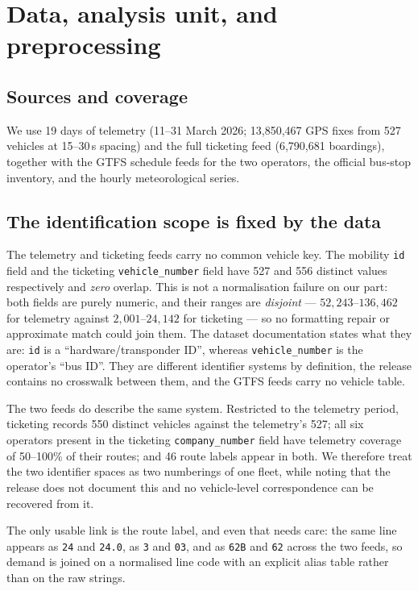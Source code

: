 \documentclass[9pt,twocolumn,twoside]{opticajnl}
\begin{document}
\section{Data, analysis unit, and preprocessing}\label{sec:data}

\subsection{Sources and coverage}

We use 19 days of telemetry (11--31 March 2026; 13{,}850{,}467 GPS fixes from 527 vehicles at
15--30\,s spacing) and the full ticketing feed (6{,}790{,}681 boardings), together with the
GTFS schedule feeds for the two operators, the official bus-stop inventory, and the hourly
meteorological series.

\subsection{The identification scope is fixed by the data}

The telemetry and ticketing feeds carry no common vehicle key. The mobility \texttt{id} field and
the ticketing \texttt{vehicle\_number} field have 527 and 556 distinct values respectively and
\emph{zero} overlap. This is not a normalisation failure on our part: both fields are purely
numeric, and their ranges are \emph{disjoint} --- $52{,}243$--$136{,}462$ for telemetry against
$2{,}001$--$24{,}142$ for ticketing --- so no formatting repair or approximate match could join
them. The dataset documentation states what they are: \texttt{id} is a ``hardware/transponder
ID'', whereas \texttt{vehicle\_number} is the operator's ``bus ID''. They are different
identifier systems by definition, the release contains no crosswalk between them, and the GTFS
feeds carry no vehicle table.

The two feeds do describe the same system. Restricted to the telemetry period, ticketing records
550 distinct vehicles against the telemetry's 527; all six operators present in the ticketing
\texttt{company\_number} field have telemetry coverage of 50--100\% of their routes; and 46
route labels appear in both. We therefore treat the two identifier spaces as two numberings of
one fleet, while noting that the release does not document this and no vehicle-level
correspondence can be recovered from it.

The only usable link is the route label, and even that needs care: the same line appears as
\texttt{24} and \texttt{24.0}, as \texttt{3} and \texttt{03}, and as \texttt{62B} and
\texttt{62} across the two feeds, so demand is joined on a normalised line code with an explicit
alias table rather than on the raw strings.
\end{document}
